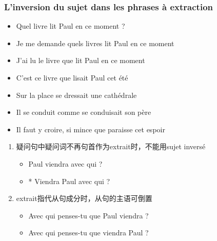\documentclass[UTF8]{report}
\begin{document}
\subsubsection{L’inversion du sujet dans les phrases à extraction}
\begin{itemize}
    \item Quel livre lit Paul en ce moment ?
    \item Je me demande quels livres lit Paul en ce moment
    \item J’ai lu le livre que lit Paul en ce moment
    \item  C’est ce livre que lisait Paul cet été
    \item Sur la place se dressait une cathédrale
    \item Il se conduit comme se conduisait son père
    \item Il faut y croire, si mince que paraisse cet espoir
\end{itemize}

\begin{enumerate}
    \item 疑问句中疑问词不再句首作为extrait时，不能用sujet inversé
    \begin{itemize}
        \item Paul viendra avec qui ?
        \item * Viendra Paul avec qui ?
    \end{itemize}
    \item extrait指代从句成分时，从句的主语可倒置
    \begin{itemize}
        \item Avec qui penses-tu que Paul viendra ?
        \item Avec qui penses-tu que viendra Paul ?
    \end{itemize}
\end{enumerate}
\end{document}
